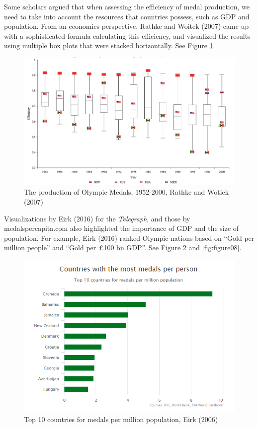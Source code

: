 \documentclass[
]{article}
\begin{document}
Some scholars argued that when assessing the efficiency of medal production, we need to take into account the resources that countries possess, such as GDP and population. From an economics perspective, Rathke and Woitek (2007) came up with a sophisticated formula calculating this efficiency, and visualized the results using multiple box plots that were stacked horizontally. See Figure \ref{fig:figure06}.

\begin{figure}

{\centering \includegraphics[width=0.95\linewidth]{static/pics/3-2} 

}

\caption{The production of Olympic Medals, 1952-2000, Rathke and Wotiek (2007)}\label{fig:figure06}
\end{figure}

Visualizations by Eirk (2016) for the \emph{Telegraph}, and those by medalspercapita.com also highlighted the importance of GDP and the size of population. For example, Eirk (2016) ranked Olympic nations based on ``Gold per million people'' and ``Gold per £100 bn GDP''. See Figure \ref{fig:figure07} and \ref{fig:figure08}.

\begin{figure}

{\centering \includegraphics[width=0.9\linewidth]{static/pics/3-3} 

}

\caption{Top 10 countries for medals per million population, Eirk (2006)}\label{fig:figure07}
\end{figure}
\end{document}
